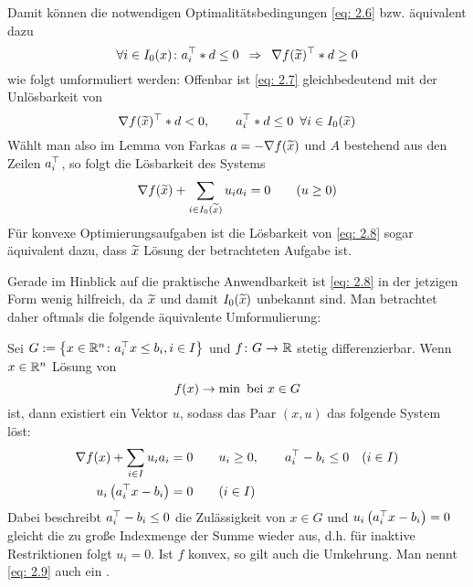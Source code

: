 Damit können die notwendigen Optimalitätsbedingungen \eqref{eq: 2.6} bzw. äquivalent dazu
\begin{equation}
	\forall i \in I_0(x) \colon a_i^{\top} * d \le 0 \enskip \Rightarrow \enskip \nabla f(\widetilde{x})^{\top} * d \ge 0 \label{eq: 2.7}
\end{equation}
wie folgt umformuliert werden: Offenbar ist \eqref{eq: 2.7} gleichbedeutend mit der Unlösbarkeit von 
\begin{equation*}
	\nabla f(\widetilde{x})^{\top} * d < 0, \qquad a_i^{\top} * d \le 0 \enskip \forall i \in I_0(\widetilde{x})
\end{equation*}
Wählt man also im Lemma von Farkas $a = - \nabla f(\widetilde{x})$ und $A$ bestehend aus den Zeilen $a_i^{\top}$, so folgt die Lösbarkeit des Systems
\begin{equation}
	\nabla f(\widetilde{x}) + \sum_{i \in I_0(\widetilde{x})} u_i a_i = 0 \qquad (u \ge 0) \label{eq: 2.8}
\end{equation}
Für konvexe Optimierungsaufgaben ist die Lösbarkeit von \eqref{eq: 2.8} sogar äquivalent dazu, dass $\widetilde{x}$ Lösung der betrachteten Aufgabe ist.

Gerade im Hinblick auf die praktische Anwendbarkeit ist \eqref{eq: 2.8} in der jetzigen Form wenig hilfreich, da $\widetilde{x}$ und damit $I_0(\widetilde{x})$ unbekannt sind. Man betrachtet daher oftmals die folgende äquivalente Umformulierung:

\begin{lemma} %
	\label{lemma: 2.8}
	Sei $G \mathrel{:=} \left\{ x \in \mathbb{R}^n \colon a_i^{\top}x \le b_i , i \in I \right\}$ und $\abb{f}{G}{\R}$ stetig differenzierbar. Wenn $x \in \mathbb{R}^n$ Lösung von
	\begin{equation*}
		f(x) \to \min \text{ bei } x \in  G
	\end{equation*}
	ist, dann existiert ein Vektor $u$, sodass das Paar $(x,u)$ das folgende System löst:
	\begin{align}
		\begin{split}
		\nabla f(x) + \sum_{i \in I} u_i a_i &= 0 \qquad u_i \ge 0 , \qquad a_i^{\top} - b_i \le 0 \quad (i \in I) \\
		u_i \left( a_i^{\top}x - b_i \right) &= 0 \qquad (i \in I)
		\end{split} \label{eq: 2.9}
	\end{align}
	Dabei beschreibt $a_i^{\top} - b_i \le 0$ die Zulässigkeit von $x \in G$ und $u_i \left( a_i^{\top}x - b_i \right) = 0$ gleicht die zu große Indexmenge der Summe wieder aus, d.h. für inaktive Restriktionen folgt $u_i = 0$.
	Ist $f$ konvex, so gilt auch die Umkehrung. Man nennt \eqref{eq: 2.9} auch ein .
\end{lemma}

